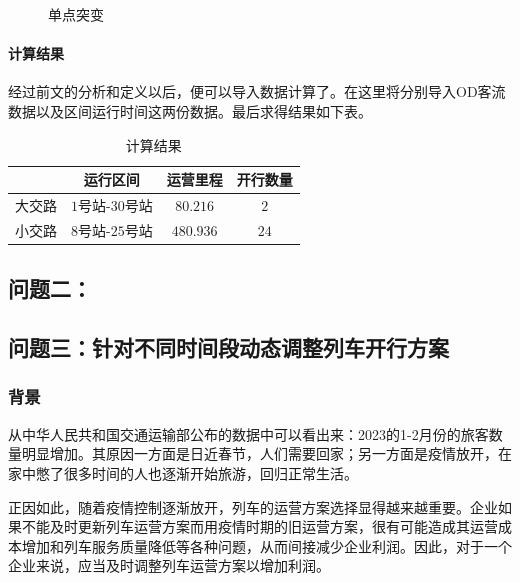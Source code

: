 \begin{enumerate}
\begin{itemize}
\begin{figure}[h]
            \caption{单点突变}
            \label{figure170202}
        \end{figure}
    \end{itemize}
\end{enumerate}


\paragraph{计算结果}

经过前文的分析和定义以后，便可以导入数据计算了。在这里将分别导入OD客流数据以及区间运行时间这两份数据。最后求得结果如下表。

\begin{table}[h]
    \centering
    \caption{计算结果}
    \begin{tabular}{cccc}
    \hline
        & 运行区间     & 运营里程   & 开行数量 \\ \hline
    大交路 & $1$号站-$30$号站 & $80.216$ & $2$    \\
    小交路 & $8$号站-$25$号站 & $480.936$ & $24$   \\ \hline
    \end{tabular}
\end{table}


\subsection{问题二：}

\subsubsection{}

\subsection{问题三：针对不同时间段动态调整列车开行方案}

\subsubsection{背景}

从中华人民共和国交通运输部公布的数据中可以看出来：2023的1-2月份的旅客数量明显增加\cite{ChengShiKeYunTongJiShuJuZhongHuaRenMinGongHeGuoJiaoTongYunShuBu}。其原因一方面是日近春节，人们需要回家；另一方面是疫情放开，在家中憋了很多时间的人也逐渐开始旅游，回归正常生活。

正因如此，随着疫情控制逐渐放开，列车的运营方案选择显得越来越重要。企业如果不能及时更新列车运营方案而用疫情时期的旧运营方案，很有可能造成其运营成本增加和列车服务质量降低等各种问题，从而间接减少企业利润。因此，对于一个企业来说，应当及时调整列车运营方案以增加利润。

